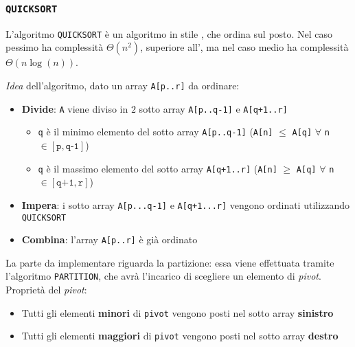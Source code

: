 \documentclass[italian, 10pt]{article}
\begin{document}
\subsubsection{\texttt{QUICKSORT}}

L'algoritmo \texttt{QUICKSORT} è un algoritmo in stile \textit{}, che ordina sul posto.
Nel caso pessimo ha complessità \(\Theta(n^2)\), superiore all', ma nel caso medio ha complessità \(\Theta\left(n \log{(n)}\right)\).

\textit{Idea} dell'algoritmo, dato un array \texttt{A[p..r]} da ordinare:

\begin{itemize}
  \item \textbf{Divide}: \texttt{A} viene diviso in \(2\) sotto array \texttt{A[p..q-1]} e \texttt{A[q+1..r]}
        \begin{itemize}
          \item \texttt{q} è il minimo elemento del sotto array \texttt{A[p..q-1]} (\texttt{A[n]} \(\leq\) \texttt{A[q]} \(\forall\) \texttt{n} \(\in [\texttt{p}, \texttt{q-1}]\))
          \item \texttt{q} è il massimo elemento del sotto array \texttt{A[q+1..r]} (\texttt{A[n]} \(\geq\) \texttt{A[q]} \(\forall\) \texttt{n} \(\in [\texttt{q+1}, \texttt{r}]\))
        \end{itemize}
  \item \textbf{Impera}: i sotto array \texttt{A[p...q-1]} e \texttt{A[q+1...r]} vengono ordinati utilizzando \texttt{QUICKSORT}
  \item \textbf{Combina}: l'array \texttt{A[p..r]} è già ordinato
\end{itemize}

La parte  da implementare riguarda la partizione: essa viene effettuata tramite l'algoritmo \texttt{PARTITION}, che avrà l'incarico di scegliere un elemento di \textit{pivot}.
Proprietà del \textit{pivot}:

\begin{itemize}
  \item Tutti gli elementi \textbf{minori} di \texttt{pivot} vengono posti nel sotto array \textbf{sinistro}
  \item Tutti gli elementi \textbf{maggiori} di \texttt{pivot} vengono posti nel sotto array \textbf{destro}
\end{itemize}
\end{document}
